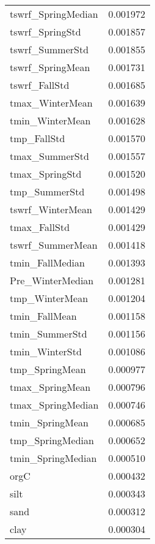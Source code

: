 \begin{tabular}{lr}
tswrf_SpringMedian & 0.001972 \\
tswrf_SpringStd & 0.001857 \\
tswrf_SummerStd & 0.001855 \\
tswrf_SpringMean & 0.001731 \\
tswrf_FallStd & 0.001685 \\
tmax_WinterMean & 0.001639 \\
tmin_WinterMean & 0.001628 \\
tmp_FallStd & 0.001570 \\
tmax_SummerStd & 0.001557 \\
tmax_SpringStd & 0.001520 \\
tmp_SummerStd & 0.001498 \\
tswrf_WinterMean & 0.001429 \\
tmax_FallStd & 0.001429 \\
tswrf_SummerMean & 0.001418 \\
tmin_FallMedian & 0.001393 \\
Pre_WinterMedian & 0.001281 \\
tmp_WinterMean & 0.001204 \\
tmin_FallMean & 0.001158 \\
tmin_SummerStd & 0.001156 \\
tmin_WinterStd & 0.001086 \\
tmp_SpringMean & 0.000977 \\
tmax_SpringMean & 0.000796 \\
tmax_SpringMedian & 0.000746 \\
tmin_SpringMean & 0.000685 \\
tmp_SpringMedian & 0.000652 \\
tmin_SpringMedian & 0.000510 \\
orgC & 0.000432 \\
silt & 0.000343 \\
sand & 0.000312 \\
clay & 0.000304 \\
\bottomrule
\end{tabular}
